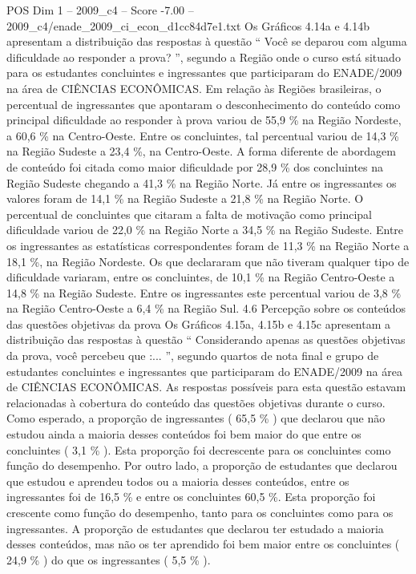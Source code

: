 \begin{textsample}{POS Dim 1 – 2009\_c4 – Score -7.00 – 2009\_c4/enade\_2009\_ci\_econ\_d1cc84d7e1.txt}
Os Gráficos 4.14a e 4.14b apresentam a distribuição das respostas à questão “ Você se deparou com alguma dificuldade ao responder a prova? ”, segundo a Região onde o curso está situado para os estudantes concluintes e ingressantes que participaram do ENADE/2009 na área de CIÊNCIAS ECONÔMICAS.
Em relação às Regiões brasileiras, o percentual de ingressantes que apontaram o desconhecimento do conteúdo como principal dificuldade ao responder à prova variou de 55,9 \% na Região Nordeste, a 60,6 \% na Centro-Oeste.
Entre os concluintes, tal percentual variou de 14,3 \% na Região Sudeste a 23,4 \%, na Centro-Oeste.
A forma diferente de abordagem de conteúdo foi citada como maior dificuldade por 28,9 \% dos concluintes na Região Sudeste chegando a 41,3 \% na Região Norte.
Já entre os ingressantes os valores foram de 14,1 \% na Região Sudeste a 21,8 \% na Região Norte.
O percentual de concluintes que citaram a falta de motivação como principal dificuldade variou de 22,0 \% na Região Norte a 34,5 \% na Região Sudeste.
Entre os ingressantes as estatísticas correspondentes foram de 11,3 \% na Região Norte a 18,1 \%, na Região Nordeste.
Os que declararam que não tiveram qualquer tipo de dificuldade variaram, entre os concluintes, de 10,1 \% na Região Centro-Oeste a 14,8 \% na Região Sudeste.
Entre os ingressantes este percentual variou de 3,8 \% na Região Centro-Oeste a 6,4 \% na Região Sul. 4.6 Percepção sobre os conteúdos das questões objetivas da prova Os Gráficos 4.15a, 4.15b e 4.15c apresentam a distribuição das respostas à questão “ Considerando apenas as questões objetivas da prova, você percebeu que :... ”, segundo quartos de nota final e grupo de estudantes concluintes e ingressantes que participaram do ENADE/2009 na área de CIÊNCIAS ECONÔMICAS.
As respostas possíveis para esta questão estavam relacionadas à cobertura do conteúdo das questões objetivas durante o curso.
Como esperado, a proporção de ingressantes ( 65,5 \% ) que declarou que não estudou ainda a maioria desses conteúdos foi bem maior do que entre os concluintes ( 3,1 \% ).
Esta proporção foi decrescente para os concluintes como função do desempenho.
Por outro lado, a proporção de estudantes que declarou que estudou e aprendeu todos ou a maioria desses conteúdos, entre os ingressantes foi de 16,5 \% e entre os concluintes 60,5 \%.
Esta proporção foi crescente como função do desempenho, tanto para os concluintes como para os ingressantes.
A proporção de estudantes que declarou ter estudado a maioria desses conteúdos, mas não os ter aprendido foi bem maior entre os concluintes ( 24,9 \% ) do que os ingressantes ( 5,5 \% ).

\end{textsample}
